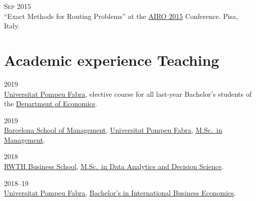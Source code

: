 \begin{paracol}{2}
  \textsc{Sep 2015}
\switchcolumn
  \\
  ``Exact Methods for Routing Problems'' at the \href{http://web.archive.org/web/20150924164917/http://www.airo.org/conferences/airo2015/}{AIRO 2015} Conference.
  Pisa, Italy.
\end{paracol}

\section*{Academic experience {\small Teaching}}

\begin{paracol}{2}
  \textsc{2019}
\switchcolumn
  \\
  \href{https://www.upf.edu/}{Universitat Pompeu Fabra}, elective course for all last-year Bachelor's students of the \href{https://www.upf.edu/web/econ/}{Department of Economics}.
\end{paracol}

\begin{paracol}{2}
  \textsc{2019}
\switchcolumn
  \\
  \href{https://www.barcelonaschoolofmanagement.upf.edu/en}{Barcelona School of Management}, \href{https://www.upf.edu}{Universitat Pompeu Fabra}, \href{https://www.barcelonaschoolofmanagement.upf.edu/en/master-of-science-in-management-specialization-in-business-analytics/study-plan}{M.Sc.\ in Management}.
\end{paracol}

\begin{paracol}{2}
  \textsc{2018}
\switchcolumn
  \\
  \href{https://www.business-school.rwth-aachen.de/en/}{RWTH Business School}, \href{https://www.business-school.rwth-aachen.de/en/programs/degree-programs/mme-dds/overview}{M.Sc.\ in Data Analytics and Decision Science}.
\end{paracol}

\begin{paracol}{2}
  \textsc{2018--19}
\switchcolumn
  \\
  \href{https://www.upf.edu/}{Universitat Pompeu Fabra}, \href{https://www.upf.edu/es/web/graus/grau-international-business-economics}{Bachelor's in International Business Economics}.
\end{paracol}

